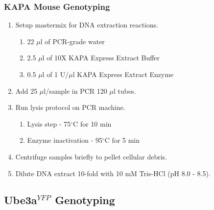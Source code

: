 \subsubsection*{KAPA Mouse Genotyping}

\begin{enumerate}
\item Setup mastermix for DNA extraction reactions.
  \begin{enumerate}
  \item 22 $\mu$l of PCR-grade water
  \item 2.5 $\mu$l of 10X KAPA Express Extract Buffer
  \item 0.5 $\mu$l of 1 U/$\mu$l KAPA Express Extract Enzyme
  \end{enumerate}
\item Add 25 $\mu$l/sample in PCR 120 $\mu$l tubes.
\item Run lysis protocol on PCR machine\footnotemark.
  \begin{enumerate}
  \item Lysis step - 75$^{\circ}$C for 10 min
  \item Enzyme inactivation - 95$^{\circ}$C for 5 min
  \end{enumerate}
\item Centrifuge samples briefly to pellet cellular debris.
\item Dilute DNA extract 10-fold with 10 mM Tris-HCl (pH 8.0 - 8.5)\footnotemark.
\end{enumerate}

\subsection{Ube3a$^{YFP}$ Genotyping}

